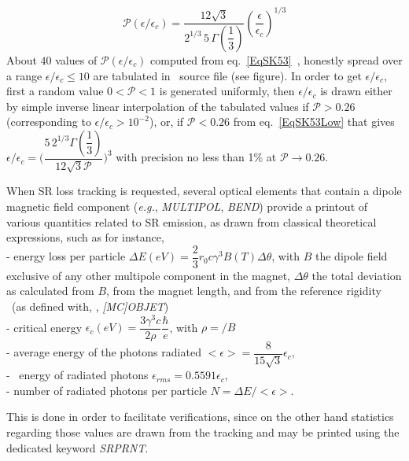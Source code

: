 \begin{equation}
\label{EqSK53Low}
\mathcal{P}(\epsilon/\epsilon_c) = \dfrac{12 \sqrt{3}}{2^{1/3} \, 5 \, \Gamma(\dfrac{1}{3})}  
(\dfrac{\epsilon}{\epsilon_c})^{1/3}
\end{equation}
%
\noindent  About $40$ values of $\mathcal{P}(\epsilon/\epsilon_c)$ computed from eq.~\ref{EqSK53}~\cite{VOKostroun}, 
honestly spread  over a range $\epsilon/\epsilon_c \leq 10$ are  tabulated 
in \zgoubi\ source file (see figure). In 
order to get $\epsilon/\epsilon_c$, first a random value $0<\mathcal{P}<1$ is generated uniformly, 
then  $\epsilon/\epsilon_c$ is drawn either  by simple inverse linear interpolation 
 of the tabulated values if $\mathcal{P}>0.26$ (corresponding to 
$\epsilon/\epsilon_c>10^{-2}$), 
or, if $\mathcal{P}<0.26$ from eq.~\ref{EqSK53Low} that gives 
 $\epsilon/\epsilon_c= \bigl( \dfrac{5 \, 2^{1/3} \Gamma(\dfrac{1}{3})}{12 \sqrt{3} \mathcal{P}}\bigr)^3$ 
 with precision no less than 1$\%$ at  $\mathcal{P}\rightarrow 0.26$. 

\bigskip


\noindent When SR loss tracking is requested, several optical elements that contain a dipole 
magnetic field component (\emph{e.g.}, \textsl{MULTIPOL}, \textsl{BEND}) provide a printout of various 
 quantities related to SR emission, as drawn from classical theoretical 
expressions, such as for instance, \\
- energy loss per particle $\Delta E(eV)= \dfrac{2}{3}r_0 c \gamma^3 B(T) \Delta \theta$,   with $B$ 
the dipole field  exclusive of any other multipole component 
in the magnet, $\Delta \theta$  the total deviation as calculated from $B$, from the 
magnet length, and from the reference rigidity \BORO\ (as defined with, \eg, \textsl{[MC]OBJET}) \\
-  critical energy $\epsilon_c(eV)=\dfrac{3 \gamma^3 c}{2 \rho} \dfrac{\hbar}{e}$, with 
$\rho =$\BORO$/B$ \\
- average energy of the photons radiated $<\epsilon> = \dfrac{8}{15 \sqrt{3}} \epsilon_c$, \\ 
- \rms\ energy of radiated photons $\epsilon_{rms} = 0.5591 \epsilon_c$, \\
- number of radiated photons per particle  $N = \Delta E /<\epsilon>$.  

\noindent This is done in order to facilitate verifications, since on the other hand statistics 
regarding those values are drawn from the tracking and may be printed using  the dedicated 
keyword \textsl{SRPRNT}. 



